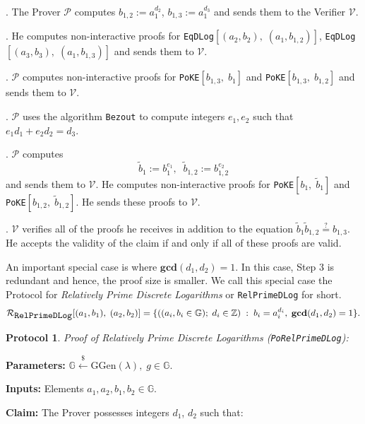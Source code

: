 \documentclass[11pt, lettersize, notitlepage, leqno, footskip=0.6cm]{article}
\newcommand{\bz}{\mathbb Z}
\newcommand{\wti}{\widetilde}
\newcommand{\mc}{\mathcal}
\newcommand{\mb}{\mathbb}
\newcommand{\mbf}{\mathbf}
\newcommand{\mr}{\mathrm}
\newcommand{\lamb}{\lambda}
\newcommand{\V}{\mc{V}}
\newcommand{\vs}{\vspace{-0.15cm}}
\newcommand{\GCD}{\mbf{gcd}}
\newtheorem{Prot}[Thm]{Protocol}
\numberwithin{equation}{section}
\begin{document}
\begin{prf1} . The Prover $\mc{P}$ computes $b_{1,2}:= a_1^{d_2}$, $b_{1,3}:= a_1^{d_3}$ and sends them to the Verifier $\V$.

. He computes non-interactive proofs for \verb|EqDLog|$[(a_2, b_2),\; (a_1, b_{1,2})]$, \verb|EqDLog|$[(a_3, b_3),\; (a_1, b_{1,3})]$ and sends them to $\mc{V}$.

. $\mc{P}$ computes non-interactive proofs for \verb|PoKE|$[b_{1,3},\;b_1 ]$ and \verb|PoKE|$[b_{1,3},\;b_{1,2} ]$ and sends them to $\V$.

. $\mc{P}$ uses the algorithm \verb|Bezout|  to compute integers $e_1, e_2$ such that $e_1d_1 + e_2d_2 = d_3$.

. $\mc{P}$ computes \vs $$\wti{b}_1:= b_1^{e_1},\;\; \wti{b}_{1,2}:= b_{1,2}^{e_2} $$ and sends them to $\V$. He computes non-interactive proofs for \verb|PoKE|$[b_1,\; \wti{b}_1]$ and \verb|PoKE|$[b_{1,2},\; \wti{b}_{1,2}]$. He sends these proofs to $\mc{V}$.

. $\mc{V}$ verifies all of the proofs he receives in addition to the equation $\wti{b}_1\wti{b}_{1,2}\stackrel{?}{=} b_{1,3}$. He accepts the validity of the claim if and only if all of these proofs are valid.\end{prf1}

\noindent An important special case is where $\GCD(d_1, d_2) = 1$. In this case, Step 3 is redundant and hence, the proof size is smaller. We call this special case the Protocol for \textit{Relatively Prime Discrete Logarithms} or \verb|RelPrimeDLog| for short. $$\mc{R}_{{\protect\verb|RelPrimeDLog|}}[(a_1,b_1),\;(a_2,b_2)] = \{((a_i, b_i\in\mb{G});\;d_i\in\bz)\;:\; b_i = a_i^{d_i},\;\GCD(d_1,d_2)=1 \} .$$ 

\vspace{0.1cm}

\begin{Prot} \normalfont \textit{Proof of Relatively Prime Discrete Logarithms} (\verb|PoRelPrimeDLog|):\end{Prot} \vspace{-0.3cm}

\noindent \textbf{Parameters:} $\mb{G}\xleftarrow{\$} \mr{GGen}(\lamb), \; g\in \mb{G}$.

\noindent \textbf{Inputs:} Elements $a_1, a_2, b_1, b_2 \in \mb{G}$.

\noindent \textbf{Claim:} The Prover possesses integers $d_1$, $d_2$ such that:
\end{document}
